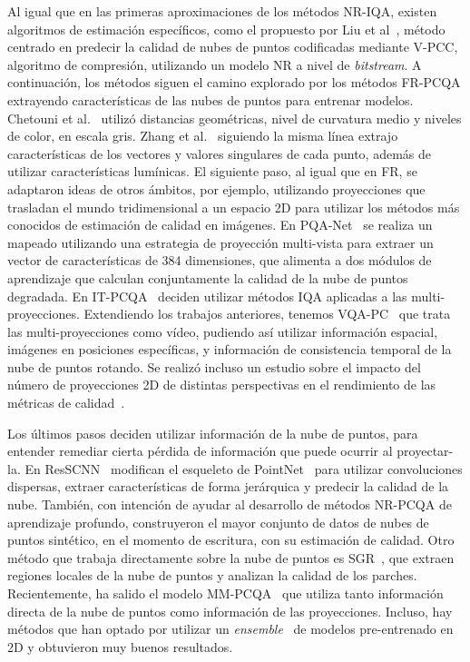 Al igual que en las primeras aproximaciones de los métodos NR-IQA, existen 
algoritmos de estimación específicos, como el propuesto por Liu et al~\cite{bitstreamPCQ},
método centrado en predecir la calidad de nubes de puntos 
codificadas mediante V-PCC, algoritmo de compresión, utilizando un modelo NR 
a nivel de \emph{bitstream}. A continuación, los métodos siguen el camino explorado 
por los métodos FR-PCQA extrayendo características de las nubes de puntos para 
entrenar modelos.  Chetouni et al.~\cite{NR-CNN-3D-PC} utilizó distancias geométricas, nivel de curvatura medio
y niveles de color, en escala gris. Zhang et al.~\cite{NR3DQA} siguiendo la misma 
línea extrajo características de los vectores y valores singulares de cada punto,
además de utilizar características lumínicas.
El siguiente paso, al igual que en FR, se adaptaron ideas de otros ámbitos, por ejemplo, utilizando 
proyecciones que trasladan el mundo tridimensional a un espacio 2D para utilizar 
los métodos más conocidos de estimación de calidad en imágenes.
En PQA-Net~\cite{PQA-Net} se realiza un mapeado 
utilizando una estrategia de proyección multi-vista para extraer un vector de 
características de 384 dimensiones, que alimenta a dos módulos de aprendizaje 
que calculan conjuntamente la calidad de la nube de puntos degradada. 
En IT-PCQA~\cite{IT-PCQA} deciden utilizar métodos IQA aplicadas a las multi-proyecciones.
Extendiendo los trabajos anteriores, tenemos VQA-PC~\cite{VQA-PC} que trata las 
multi-proyecciones como vídeo, pudiendo así utilizar información espacial, 
imágenes en posiciones específicas, y información de consistencia temporal 
de la nube de puntos rotando. 
Se realizó incluso un estudio sobre el impacto del número de proyecciones 2D de 
distintas perspectivas en el rendimiento de las métricas de calidad~\cite{ImpactOf2DProyections, IT-PCQA}.

Los últimos pasos deciden utilizar información de la nube de puntos, para 
entender remediar cierta pérdida de información que puede ocurrir al proyectar-la. 
En ResSCNN~\cite{ResSCNN} modifican el esqueleto de PointNet~\cite{PointNet} para 
utilizar convoluciones dispersas, extraer características de forma jerárquica y 
predecir la calidad de la nube. También, con intención de ayudar al desarrollo 
de métodos NR-PCQA de aprendizaje profundo, construyeron el mayor conjunto de datos
de nubes de puntos sintético, en el momento de escritura, con su estimación de calidad. 
Otro método que trabaja directamente sobre la nube de puntos es SGR~\cite{SGR}, 
que extraen regiones locales de la nube de puntos y analizan la calidad de los parches.
Recientemente, ha salido el modelo MM-PCQA~\cite{MM-PCQA} que utiliza tanto información 
directa de la nube de puntos como información de las proyecciones. Incluso, hay 
métodos que han optado por utilizar un \emph{ensemble}~\cite{EnsemblePCQA} de 
modelos pre-entrenado en 2D y obtuvieron muy buenos resultados. 

